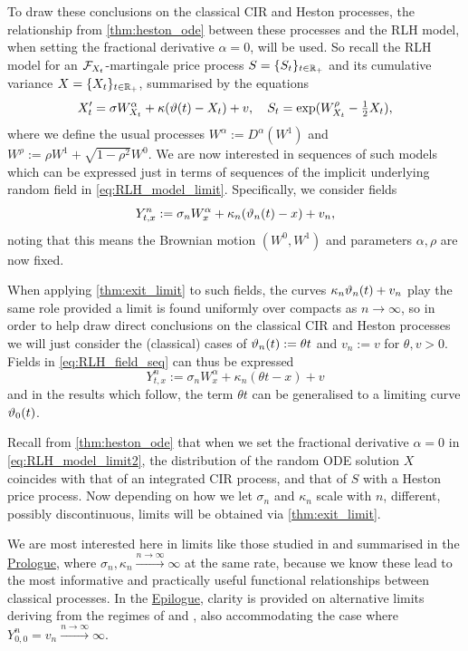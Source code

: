 To draw these conclusions on the classical CIR and Heston processes, the relationship from \autoref{thm:heston_ode} between these processes and the RLH model, when setting the fractional derivative $\alpha=0$, will be used. So recall the RLH model for an $\mathcal{F}_{X_t}$-martingale price process $S=\{S_t\}_{t\in\mathbb{R}_+}$ and its cumulative variance $X=\{X_t\}_{t\in\mathbb{R}_+}$, summarised by the equations
\begin{equation}\label{eq:RLH_model_limit}
    X'_t = \sigma W^\alpha_{X_t} + \kappa(\vartheta(t) - X_t) + v,\quad S_t=\exp(W^\rho_{X_t}-\tfrac12 X_t),
\end{equation}
where we define the usual processes $W^\alpha:=D^\alpha(W^1)$ and $W^\rho:=\rho W^1+\sqrt{1-\rho^2}W^0$. We are now interested in sequences of such models which can be expressed just in terms of sequences of the implicit underlying random field in \autoref{eq:RLH_model_limit}. Specifically, we consider fields
\begin{equation}\label{eq:RLH_field_seq}
    Y^n_{t,x} := \sigma_n W^\alpha_x + \kappa_n(\vartheta_n(t) - x) + v_n,
\end{equation}
noting that this means the Brownian motion $(W^0,W^1)$ and parameters $\alpha,\rho$ are now fixed.

When applying \autoref{thm:exit_limit} to such fields, the curves $\kappa_n\vartheta_n(t)+v_n$ play the same role provided a limit is found uniformly over compacts as $n\to\infty$, so in order to help draw direct conclusions on the classical CIR and Heston processes we will just consider the (classical) cases of $\vartheta_n(t):=\theta t$ and $v_n:=v$ for $\theta,v>0$. Fields in \autoref{eq:RLH_field_seq} can thus be expressed
\begin{equation}\label{eq:RLH_model_limit2}
    Y^n_{t,x} := \sigma_n W^\alpha_x + \kappa_n(\theta t - x) + v
\end{equation}
and in the results which follow, the term $\theta t$ can be generalised to a limiting curve $\vartheta_0(t)$.

Recall from \autoref{thm:heston_ode} that when we set the fractional derivative $\alpha=0$ in \autoref{eq:RLH_model_limit2}, the distribution of the random ODE solution $X$ coincides with that of an integrated CIR process, and that of $S$ with a Heston price process. Now depending on how we let $\sigma_n$ and $\kappa_n$ scale with $n$, different, possibly discontinuous, limits will be obtained via \autoref{thm:exit_limit}.

We are most interested here in limits like those studied in \cite{mechkov_2015} and summarised in the \hyperlink{prologue}{Prologue}, where $\sigma_n,\kappa_n\xrightarrow{n\to\infty}\infty$ at the same rate, because we know these lead to the most informative and practically useful functional relationships between classical processes. In the \hyperlink{epilogue}{Epilogue}, clarity is provided on alternative limits deriving from the regimes of \cite{heston_1993} and \cite{fouque_2011}, also accommodating the case where $Y^n_{0,0} = v_n\xrightarrow{n\to\infty}\infty$.

